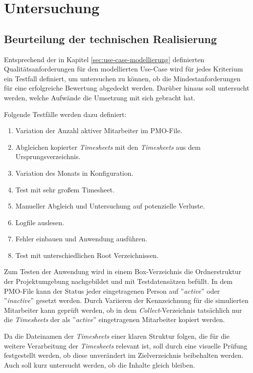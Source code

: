 \chapter{Untersuchung}
\label{chap:untersuchung}

\section{Beurteilung der technischen Realisierung}
Entsprechend der in Kapitel \ref{sec:use-case-modellierung} definierten Qualitätsanforderungen für den modellierten Use-Case wird für jedes Kriterium ein Testfall definiert, um untersuchen zu können, ob die Mindestanforderungen für eine erfolgreiche Bewertung abgedeckt werden. Darüber hinaus soll untersucht werden, welche Aufwände die Umsetzung mit sich gebracht hat.

Folgende Testfälle werden dazu definiert:
\begin{enumerate}
    \item Variation der Anzahl aktiver Mitarbeiter im PMO-File.
    \item Abgleichen kopierter \textit{\glspl{Timesheet}} mit den \textit{\glspl{Timesheet}} aus dem Ursprungsverzeichnis.
    \item Variation des Monats in Konfiguration.
    \item Test mit sehr großem Timesheet.
    \item Manueller Abgleich und Untersuchung auf potenzielle Verluste.
    \item Logfile auslesen.
    \item Fehler einbauen und Anwendung ausführen.
    \item Test mit unterschiedlichen Root Verzeichnissen.
\end{enumerate}

Zum Testen der Anwendung wird in einem \gls{Box}-Verzeichnis die Ordnerstruktur der Projektumgebung nachgebildet und mit Testdatensätzen befüllt. In dem PMO-File kann der Status jeder eingetragenen Person auf ''\textit{active}'' oder ''\textit{inactive}'' gesetzt werden. Durch Variieren der Kennzeichnung für die simulierten Mitarbeiter kann geprüft werden, ob in dem \textit{Collect}-Verzeichnis tatsächlich nur die \textit{\glspl{Timesheet}} der als ''\textit{active}'' eingetragenen Mitarbeiter kopiert werden.

Da die Dateinamen der \textit{\glspl{Timesheet}} einer klaren Struktur folgen, die für die weitere Verarbeitung der \textit{\glspl{Timesheet}} relevant ist, soll durch eine visuelle Prüfung festgestellt werden, ob diese unverändert im Zielverzeichnis beibehalten werden. Auch soll kurz untersucht werden, ob die Inhalte gleich bleiben.

